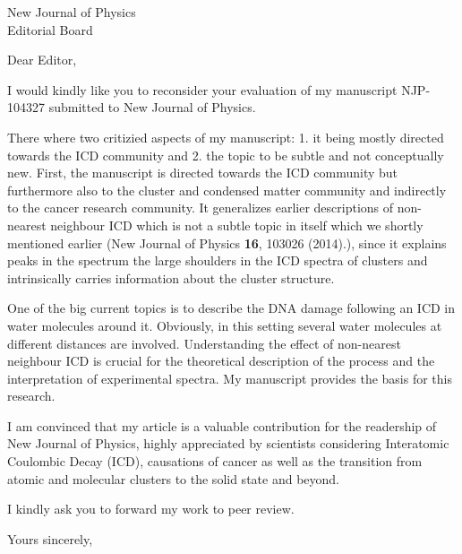 \documentclass[DIN,10pt,pagenumber=false,parskip=half,fromalign=left,fromphone=false,fromemail=true,fromurl=false,fromlogo=true,fromrule=false]{scrlttr2}
\begin{document}
\begin{letter}{New Journal of Physics\\Editorial Board}
\opening{Dear Editor,}

I would kindly like you to reconsider your evaluation of my manuscript
NJP-104327 submitted to New Journal of Physics.

There where two critizied aspects of my manuscript: 1. it being mostly directed
towards the ICD community and 2. the topic to be subtle and not conceptually new.
First, the manuscript is directed towards the ICD community but furthermore also
to the cluster and condensed matter community and indirectly to the cancer
research community. It generalizes earlier descriptions of non-nearest neighbour
ICD which is not a subtle topic in itself which we shortly mentioned earlier
(New Journal of Physics \textbf{16}, 103026 (2014).), since it explains peaks in the spectrum the
large shoulders in the ICD spectra of clusters and intrinsically carries
information about the cluster structure.

One of the big current topics is to describe the DNA damage following an ICD in
water molecules around it. Obviously, in this setting several water molecules
at different distances are involved. Understanding the effect of non-nearest
neighbour ICD is crucial for the theoretical description of the process and the
interpretation of experimental spectra. My manuscript provides the basis for
this research.

I am convinced that my article is a valuable contribution for the readership of New Journal of Physics, highly appreciated by scientists considering Interatomic Coulombic
Decay (ICD), causations of cancer as well as
the transition from atomic and molecular clusters to the solid state and beyond.

I kindly ask you to forward my work to peer review.\\


\closing{Yours sincerely,}
\end{letter}
\end{document}
